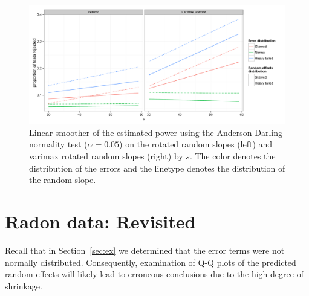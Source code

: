 \documentclass[12pt]{article} %
\begin{document}
\begin{figure}
	\centering
	\includegraphics[width=\textwidth]{ad_slope_power.pdf}
	\caption{\label{fig:power-slope}Linear smoother of the estimated power using the Anderson-Darling normality test ($\alpha = 0.05$) on the rotated random slopes (left) and varimax rotated random slopes (right) by $s$. The color denotes the distribution of the errors and the linetype denotes the distribution of the random slope.}
\end{figure}



%
%
%
%

\section{Radon data: Revisited}\label{sec:radon2}
Recall that in Section~\ref{sec:ex} we determined that the error terms were not normally distributed. Consequently, examination of Q-Q plots of the predicted random effects will likely lead to erroneous conclusions due to the high degree of shrinkage. 
\end{document}
